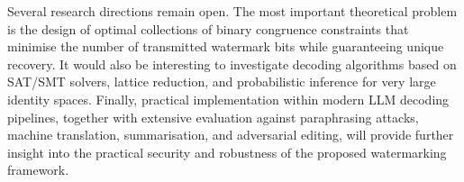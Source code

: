 \documentclass[a4paper,11pt]{llncs}
\begin{document}
Several research directions remain open. The most important theoretical problem is the design of optimal collections of binary congruence constraints that minimise the number of transmitted watermark bits while guaranteeing unique recovery. It would also be interesting to investigate decoding algorithms based on SAT/SMT solvers, lattice reduction, and probabilistic inference for very large identity spaces. Finally, practical implementation within modern LLM decoding pipelines, together with extensive evaluation against paraphrasing attacks, machine translation, summarisation, and adversarial editing, will provide further insight into the practical security and robustness of the proposed watermarking framework.

{\footnotesize


}
\end{document}
